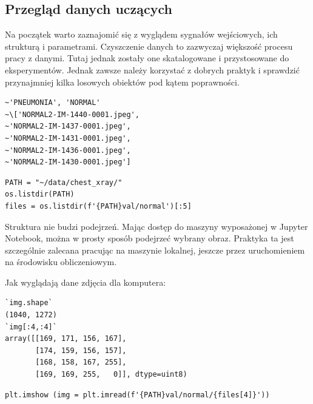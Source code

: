 \documentclass[12pt,a4paper,twoside,titlepage,openright]{book}
\begin{document}
\subsection{Przegląd danych uczących}
Na początek warto zaznajomić się z wyglądem sygnałów wejściowych, ich strukturą i parametrami. Czyszczenie danych to zazwyczaj większość procesu pracy z danymi. Tutaj jednak zostały one skatalogowane i przystosowane do eksperymentów. Jednak zawsze należy korzystać z dobrych praktyk i sprawdzić przynajmniej kilka losowych obiektów pod kątem poprawności.

\noindent
\begin{minipage}{\linewidth}
\begin{lstlisting}[caption=Podgląd danych, label=lst:test]
~'PNEUMONIA', 'NORMAL'
~\['NORMAL2-IM-1440-0001.jpeg',
~'NORMAL2-IM-1437-0001.jpeg',
~'NORMAL2-IM-1431-0001.jpeg',
~'NORMAL2-IM-1436-0001.jpeg',
~'NORMAL2-IM-1430-0001.jpeg']
\end{lstlisting}
\end{minipage}

\noindent
\begin{minipage}{\linewidth}
\begin{lstlisting}[caption=Wyświetlenie struktury danych, label=lst:test]
PATH = "~/data/chest_xray/"
os.listdir(PATH)
files = os.listdir(f'{PATH}val/normal')[:5]
\end{lstlisting}
\end{minipage}

Struktura nie budzi podejrzeń. Mając dostęp do maszyny wyposażonej w Jupyter Notebook, można w prosty sposób podejrzeć wybrany obraz. Praktyka ta jest szczególnie zalecana pracując na maszynie lokalnej, jeszcze przez uruchomieniem na środowisku obliczeniowym.

Jak wyglądają dane zdjęcia dla komputera:

\noindent
\begin{minipage}{\linewidth}
\begin{lstlisting}[caption=Struktura obrazu w formie macierzy, label=lst:test]
`img.shape`
(1040, 1272)
`img[:4,:4]`
array([[169, 171, 156, 167],
       [174, 159, 156, 157],
       [168, 158, 167, 255],
       [169, 169, 255,   0]], dtype=uint8)
\end{lstlisting}
\end{minipage}

\noindent
\begin{minipage}{\linewidth}
\begin{lstlisting}[caption=Wyświetlenie obrazu w środowisku graficznym, label=lst:test]
plt.imshow (img = plt.imread(f'{PATH}val/normal/{files[4]}'))
\end{lstlisting}
\end{minipage}
\end{document}
